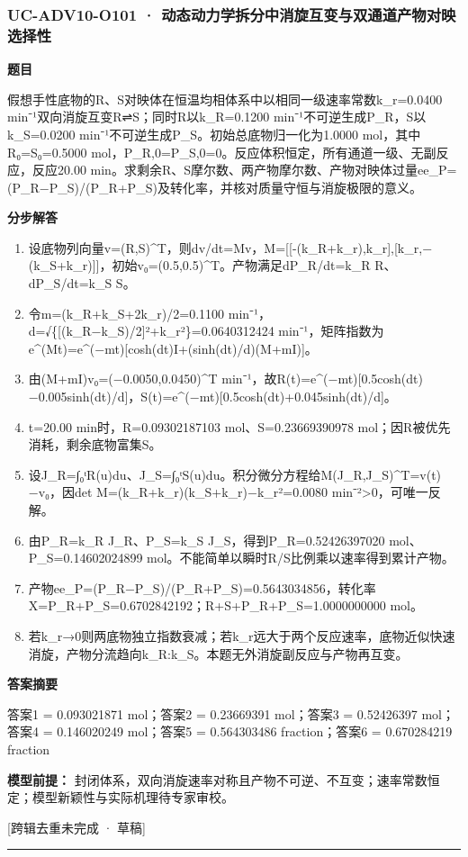 \documentclass[UTF8,11pt,a4paper]{ctexart}
\begin{document}
\subsubsection*{UC-ADV10-O101 · 动态动力学拆分中消旋互变与双通道产物对映选择性}
\noindent\textbf{题目}\par
假想手性底物的R、S对映体在恒温均相体系中以相同一级速率常数k\_r=0.0400 min⁻¹双向消旋互变R⇌S；同时R以k\_R=0.1200 min⁻¹不可逆生成P\_R，S以k\_S=0.0200 min⁻¹不可逆生成P\_S。初始总底物归一化为1.0000 mol，其中R₀=S₀=0.5000 mol，P\_R,0=P\_S,0=0。反应体积恒定，所有通道一级、无副反应，反应20.00 min。求剩余R、S摩尔数、两产物摩尔数、产物对映体过量ee\_P=(P\_R−P\_S)/(P\_R+P\_S)及转化率，并核对质量守恒与消旋极限的意义。\par
\medskip\noindent\textbf{分步解答}
\begin{enumerate}
\item 设底物列向量v=(R,S)\textasciicircum{}T，则dv/dt=Mv，M=[[-(k\_R+k\_r),k\_r],[k\_r,−(k\_S+k\_r)]]，初始v₀=(0.5,0.5)\textasciicircum{}T。产物满足dP\_R/dt=k\_R R、dP\_S/dt=k\_S S。
\item 令m=(k\_R+k\_S+2k\_r)/2=0.1100 min⁻¹，d=√\{[(k\_R−k\_S)/2]²+k\_r²\}=0.0640312424 min⁻¹，矩阵指数为e\textasciicircum{}(Mt)=e\textasciicircum{}(−mt)[cosh(dt)I+(sinh(dt)/d)(M+mI)]。
\item 由(M+mI)v₀=(−0.0050,0.0450)\textasciicircum{}T min⁻¹，故R(t)=e\textasciicircum{}(−mt)[0.5cosh(dt)−0.005sinh(dt)/d]，S(t)=e\textasciicircum{}(−mt)[0.5cosh(dt)+0.045sinh(dt)/d]。
\item t=20.00 min时，R=0.09302187103 mol、S=0.23669390978 mol；因R被优先消耗，剩余底物富集S。
\item 设J\_R=∫₀ᵗR(u)du、J\_S=∫₀ᵗS(u)du。积分微分方程给M(J\_R,J\_S)\textasciicircum{}T=v(t)−v₀，因det M=(k\_R+k\_r)(k\_S+k\_r)−k\_r²=0.0080 min⁻²>0，可唯一反解。
\item 由P\_R=k\_R J\_R、P\_S=k\_S J\_S，得到P\_R=0.52426397020 mol、P\_S=0.14602024899 mol。不能简单以瞬时R/S比例乘以速率得到累计产物。
\item 产物ee\_P=(P\_R−P\_S)/(P\_R+P\_S)=0.5643034856，转化率X=P\_R+P\_S=0.6702842192；R+S+P\_R+P\_S=1.0000000000 mol。
\item 若k\_r→0则两底物独立指数衰减；若k\_r远大于两个反应速率，底物近似快速消旋，产物分流趋向k\_R:k\_S。本题无外消旋副反应与产物再互变。
\end{enumerate}
\noindent\textbf{答案摘要}\par
答案1 = 0.093021871 mol；答案2 = 0.23669391 mol；答案3 = 0.52426397 mol；答案4 = 0.146020249 mol；答案5 = 0.564303486 fraction；答案6 = 0.670284219 fraction\par
\noindent\textbf{模型前提：}
封闭体系，双向消旋速率对称且产物不可逆、不互变；速率常数恒定；模型新颖性与实际机理待专家审校。\par
\noindent\textcolor{red!65!black}{[跨辑去重未完成 · 草稿]} \par
\medskip\hrule\medskip
{}
\end{document}
